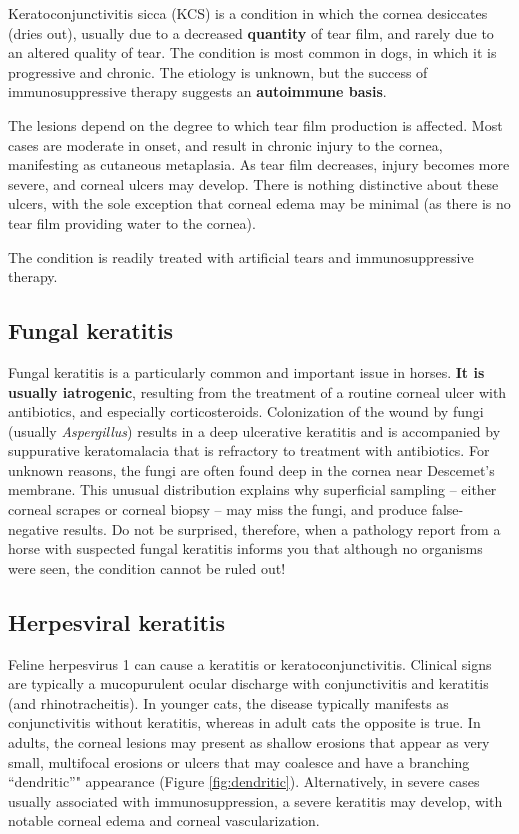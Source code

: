 \documentclass[
  openany]{article}
\begin{document}
Keratoconjunctivitis sicca (KCS) is a condition in which the cornea desiccates (dries out), usually due to a decreased \textbf{quantity} of tear film, and rarely due to an altered quality of tear. The condition is most common in dogs, in which it is progressive and chronic. The etiology is unknown, but the success of immunosuppressive therapy suggests an \textbf{autoimmune basis}.

The lesions depend on the degree to which tear film production is affected. Most cases are moderate in onset, and result in chronic injury to the cornea, manifesting as cutaneous metaplasia. As tear film decreases, injury becomes more severe, and corneal ulcers may develop. There is nothing distinctive about these ulcers, with the sole exception that corneal edema may be minimal (as there is no tear film providing water to the cornea).

The condition is readily treated with artificial tears and immunosuppressive therapy.

\hypertarget{fungal-keratitis}{%
\subsection{Fungal keratitis}\label{fungal-keratitis}}

Fungal keratitis is a particularly common and important issue in horses. \textbf{It is usually iatrogenic}, resulting from the treatment of a routine corneal ulcer with antibiotics, and especially corticosteroids. Colonization of the wound by fungi (usually \emph{Aspergillus}) results in a deep ulcerative keratitis and is accompanied by suppurative keratomalacia that is refractory to treatment with antibiotics. For unknown reasons, the fungi are often found deep in the cornea near Descemet's membrane. This unusual distribution explains why superficial sampling -- either corneal scrapes or corneal biopsy -- may miss the fungi, and produce false-negative results. Do not be surprised, therefore, when a pathology report from a horse with suspected fungal keratitis informs you that although no organisms were seen, the condition cannot be ruled out!

\hypertarget{herpesviral-keratitis}{%
\subsection{Herpesviral keratitis}\label{herpesviral-keratitis}}

Feline herpesvirus 1 can cause a keratitis or keratoconjunctivitis. Clinical signs are typically a mucopurulent ocular discharge with conjunctivitis and keratitis (and rhinotracheitis). In younger cats, the disease typically manifests as conjunctivitis without keratitis, whereas in adult cats the opposite is true. In adults, the corneal lesions may present as shallow erosions that appear as very small, multifocal erosions or ulcers that may coalesce and have a branching ``dendritic''" appearance (Figure \ref{fig:dendritic}). Alternatively, in severe cases usually associated with immunosuppression, a severe keratitis may develop, with notable corneal edema and corneal vascularization.
\end{document}
